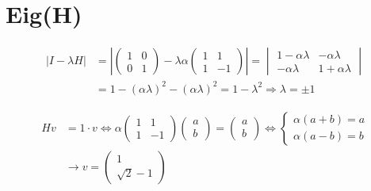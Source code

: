 \documentclass[12pt]{article}
\begin{document}

\section{Eig(H)}

\begin{equation*}
\begin{aligned}
| I - \lambda H |
& =
\left|
\begin{pmatrix}
1 & 0 \\ 
0 & 1 
\end{pmatrix}
- \lambda \alpha
\begin{pmatrix}
1 & 1 \\ 
1 & -1 
\end{pmatrix}
\right|
=
\begin{vmatrix}
1 - \alpha \lambda & - \alpha \lambda \\ 
- \alpha \lambda & 1 + \alpha \lambda 
\end{vmatrix} \\
& =
1 - (\alpha \lambda)^2  - (\alpha \lambda)^2 = 1 - \lambda^2
\Rightarrow
\lambda = \pm 1
\end{aligned}
\end{equation*}


\begin{equation*}
\begin{aligned}
Hv & = 1 \cdot v \Leftrightarrow 
\alpha
\begin{pmatrix}
1 & 1 \\ 
1 & -1 
\end{pmatrix}
\begin{pmatrix}
a \\ 
b 
\end{pmatrix}
=
\begin{pmatrix}
a \\ 
b 
\end{pmatrix}
\Leftrightarrow 
\begin{cases}
\alpha (a + b) = a \\
\alpha (a - b) = b
\end{cases} \\
& \rightarrow
v = 
\begin{pmatrix}
1 \\ 
\sqrt{2} - 1
\end{pmatrix}
\end{aligned}
\end{equation*}
\end{document}
